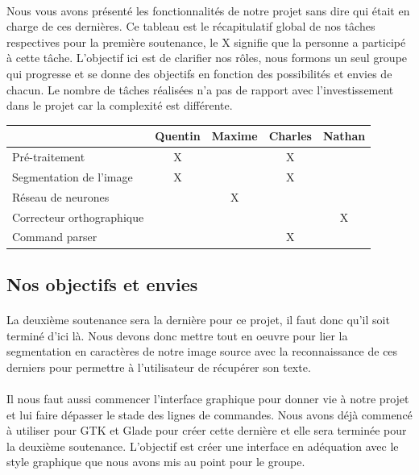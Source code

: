 \documentclass{article}
\begin{document}
\paragraph{} Nous vous avons présenté les fonctionnalités de notre projet sans dire qui était en charge de ces dernières. Ce tableau est le récapitulatif global de nos tâches respectives pour la première soutenance, le X signifie que la personne a participé à cette tâche. L'objectif ici est de clarifier nos rôles, nous formons un seul groupe qui progresse et se donne des objectifs en fonction des possibilités et envies de chacun. Le nombre de tâches réalisées n'a pas de rapport avec l'investissement dans le projet car la complexité est différente.
\begin{center}
\vspace*{0.2cm}
\begin{tabular}{|l|c|c|c|c|}
  \hline
  & Quentin & Maxime & Charles & Nathan \\
  \hline
  Pré-traitement & X &  & X &  \\
  \hline
  Segmentation de l'image & X &  & X &  \\
  \hline
  Réseau de neurones &  & X &  &  \\
  \hline
  Correcteur orthographique &  &  &  & X \\
  \hline
  Command parser &  &  & X &  \\
  \hline
\end{tabular}
\end{center}


\subsection{Nos objectifs et envies}

\paragraph{}La deuxième soutenance sera la dernière pour ce projet, il faut donc qu'il soit terminé d'ici là. Nous devons donc mettre tout en oeuvre pour lier la segmentation en caractères de notre image source avec la reconnaissance de ces derniers pour permettre à l'utilisateur de récupérer son texte.

\paragraph{}Il nous faut aussi commencer l'interface graphique pour donner vie à notre projet et lui faire dépasser le stade des lignes de commandes. Nous avons déjà commencé à utiliser pour GTK et Glade pour créer cette dernière et elle sera terminée pour la deuxième soutenance. L'objectif est créer une interface en adéquation avec le style graphique que nous avons mis au point pour le groupe.
\end{document}
